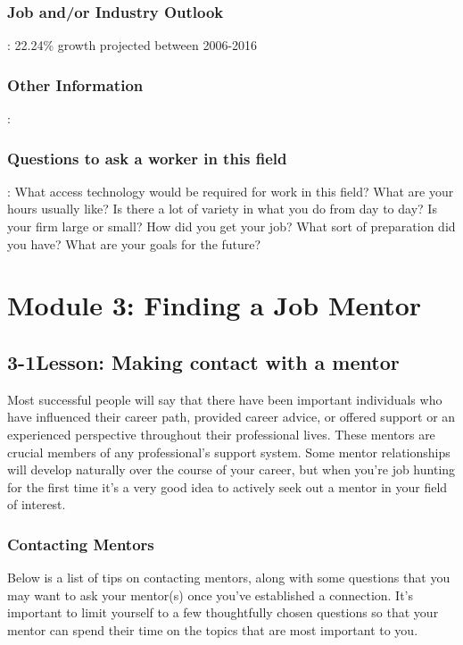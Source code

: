 \subsubsection*{Job and/or Industry Outlook}: 22.24\% growth projected between 2006-2016

\subsubsection*{Other Information}:

\subsubsection*{Questions to ask a worker in this field}:
\break What access technology would be required for work in this field?
\break What are your hours usually like?
\break Is there a lot of variety in what you do from day to day?
\break Is your firm large or small?
\break How did you get your job?
\break What sort of preparation did you have?
\break What are your goals for the future?

\pagebreak \section*{Module 3:  Finding a Job Mentor}
\noindent\makebox[\textwidth]{\rule{\linewidth}{0.4pt}}  \localtableofcontents
\noindent\makebox[\textwidth]{\rule{\linewidth}{0.4pt}}

\pagebreak \subsection*{3-1\quad  Lesson: Making contact with a mentor}
Most successful people will say that there have been important individuals who have influenced their career path, provided career advice, or offered support or an experienced perspective throughout their professional lives. These mentors are crucial members of any professional's support system. Some mentor relationships will develop naturally over the course of your career, but when you're job hunting for the first time it's a very good idea to actively seek out a mentor in your field of interest.
\subsubsection*{Contacting Mentors}
Below is a list of tips on contacting mentors, along with some questions that you may want to ask your mentor(s) once you've established a connection. It's important to limit yourself to a few thoughtfully chosen questions so that your mentor can spend their time on the topics that are most important to you.

